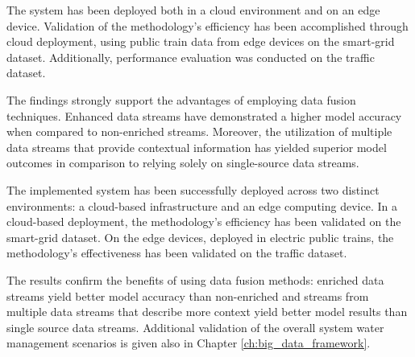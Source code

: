 The system has been deployed both in a cloud environment and on an edge device. 
Validation of the methodology's efficiency has been accomplished through cloud deployment, using public train data from edge devices on the smart-grid dataset. Additionally, performance evaluation was conducted on the traffic dataset.

The findings strongly support the advantages of employing data fusion techniques. Enhanced data streams have demonstrated a higher model accuracy when compared to non-enriched streams. Moreover, the utilization of multiple data streams that provide contextual information has yielded superior model outcomes in comparison to relying solely on single-source data streams.

The implemented system has been successfully deployed across two distinct environments: a cloud-based infrastructure and an edge computing device.
In a cloud-based deployment, the methodology's efficiency has been validated on the smart-grid dataset. 
On the edge devices, deployed in electric public trains, the methodology's effectiveness has been validated on the traffic dataset.

The results confirm the benefits of using data fusion methods: enriched data streams yield better model accuracy than non-enriched and streams from multiple data streams that describe more context yield better model results than single source data streams.
Additional validation of the overall system water management scenarios is given also in Chapter \ref{ch:big_data_framework}.

